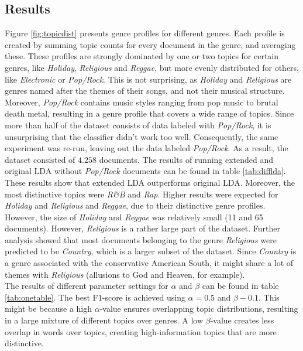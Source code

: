 \subsection{Results}
Figure \ref{fig:topicdist} presents genre profiles for different genres. Each profile is created by summing topic counts for every document in the genre, and averaging these. These profiles are strongly dominated by one or two topics for certain genres, like \textit{Holiday}, \textit{Religious} and \textit{Reggae}, but more evenly distributed for others, like \textit{Electronic} or \textit{Pop/Rock}. This is not surprising, as \textit{Holiday} and \textit{Religious} are genres named after the themes of their songs, and not their musical structure. Moreover, \textit{Pop/Rock} contains music styles ranging from pop music to brutal death metal, resulting in a genre profile that covers a wide range of topics. Since more than half of the dataset consists of data labeled with \textit{Pop/Rock}, it is unsurprising that the classifier didn't work too well. 
Consequently, the same experiment was re-run, leaving out the data labeled \textit{Pop/Rock}. As a result, the dataset consisted of $4.258$ documents. The results of running extended and original LDA without \textit{Pop/Rock} documents can be found in table \ref{tab:difflda}. These results show that extended LDA outperforms original LDA. Moreover, the most distinctive topics were \textit{R\&B} and \textit{Rap}. Higher results were expected for \textit{Holiday} and \textit{Religious} and \textit{Reggae}, due to their distinctive genre profiles. However, the size of \textit{Holiday} and \textit{Reggae} was relatively small (11 and 65 documents). However, \textit{Religious} is a rather large part of the dataset. Further analysis showed that most documents belonging to the genre \textit{Religious} were predicted to be \textit{Country}, which is a larger subset of the dataset. Since \textit{Country} is a genre associated with the conservative American South, it might share a lot of themes with \textit{Religious} (allusions to God and Heaven, for example). \\
The results of different parameter settings for $\alpha$ and $\beta$ can be found in table \ref{tab:onetable}. The best F1-score is achieved using $\alpha=0.5$ and $\beta-0.1$. This might be because a high $\alpha$-value ensures overlapping topic distributions, resulting in a large mixture of different topics over genres. A low $\beta$-value creates less overlap in words over topics, creating high-information topics that are more distinctive.

\label{tab:onetable}




